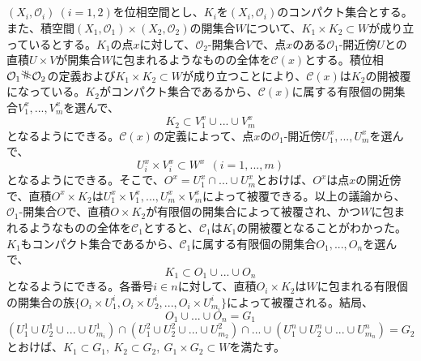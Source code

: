 \documentclass{jsarticle}
\begin{document}
\subsection{}
$(X_i,\mathcal{O}_i)\ (i=1,2)$を位相空間とし、$K_i$を$(X_i,\mathcal{O}_i)$のコンパクト集合とする。また、積空間$(X_1,\mathcal{O}_1)\times(X_2,\mathcal{O}_2)$の開集合$W$について、$K_1\times K_2\subset W$が成り立っているとする。$K_1$の点$x$に対して、$\mathcal{O}_2$-開集合$V$で、点$x$のある$\mathcal{O}_1$-開近傍$U$との直積$U\times V$が開集合$W$に包まれるようなものの全体を$\mathcal{C}(x)$とする。積位相$\mathcal{O}_1\rotatebox{80}{\#}\mathcal{O}_2$の定義および$K_1\times K_2\subset W$が成り立つことにより、$\mathcal{C}(x)$は$K_2$の開被覆になっている。$K_2$がコンパクト集合であるから、$\mathcal{C}(x)$に属する有限個の開集合$V_1^x,...,V_m^x$を選んで、
\[K_2\subset V^x_1\cup...\cup V^x_m\]
となるようにできる。$\mathcal{C}(x)$の定義によって、点$x$の$\mathcal{O}_1$-開近傍$U^x_1,...,U^x_m$を選んで、
\[U^x_i\times V^x_i\subset W^x\ \ (i=1,...,m)\]
となるようにできる。そこで、$O^x=U^x_1\cap...\cup U^x_m$とおけば、$O^x$は点$x$の開近傍で、直積$O^x\times K_2$は$U_1^x\times V^x_1,...,U^x_m\times V^x_m$によって被覆できる。以上の議論から、$\mathcal{O}_1$-開集合$O$で、直積$O\times K_2$が有限個の開集合によって被覆され、かつ$W$に包まれるようなものの全体を$\mathcal{C}_1$とすると、$\mathcal{C}_1$は$K_1$の開被覆となることがわかった。$K_1$もコンパクト集合であるから、$\mathcal{C}_1$に属する有限個の開集合$O_1,...,O_n$を選んで、
\[K_1\subset O_1\cup...\cup O_n\]
となるようにできる。各番号$i\in n$に対して、直積$O_i\times K_2$は$W$に包まれる有限個の開集合の族$\{O_i\times U_1^i,O_i\times U_2^i,...,O_i\times U_{m_i}^i\}$によって被覆される。結局、
\[O_1\cup...\cup O_n=G_1\]
\[ (U_1^1\cup U_2^1\cup...\cup U_{m_i}^1)\cap(U_1^2\cup U_2^2\cup...\cup U_{m_2}^2)\cap...\cup(U_1^n\cup U_2^n\cup...\cup U_{m_n}^n)=G_2\]
とおけば、$K_1\subset G_1,\  K_2\subset G_2,\ G_1\times G_2\subset W$を満たす。



\end{document}
